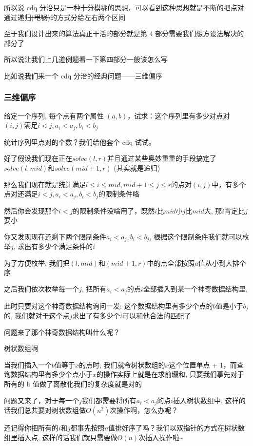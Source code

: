 所以说 cdq 分治只是一种十分模糊的思想，可以看到这种思想就是不断的把点对通过递归\sout{(甩锅)}的方式分给左右两个区间

至于我们设计出来的算法真正干活的部分就是第 4 部分需要我们想方设法解决的部分了

所以说让我们上几道例题看一下第四部分一般该怎么写

比如说我们来一个 cdq 分治的经典问题——三维偏序

\subsubsection{三维偏序}

给定一个序列, 每个点有两个属性 $(a,b)$，试求：这个序列里有多少对点对$(i,j)$满足$i<j,a_{i}<a_{j},b_{i}<b_{j}$

统计序列里点对的个数？我们给他套个 cdq 试试。

好了假设我们现在正在$solve(l,r)$并且通过某些奥妙重重的手段搞定了$solve(l,mid)$和$solve(mid+1,r)$ (其实就是递归)

那么我们现在就是统计满足$l \leq i \leq mid,mid+1 \leq j \leq r$的点对$(i,j)$中，有多个点对还满足$i<j,a_{i}<a_{j},b_{i}<b_{j}$的限制条件咯

然后你会发现那个$i<j$的限制条件没啥用了，既然$i$比$mid$小$j$比$mid$大, 那$i$肯定比$j$要小

你又发现现在还剩下两个限制条件$a_{i}<a_{j},b_{i}<b_{j}$, 根据这个限制条件我们就可以枚举$j$, 求出有多少个满足条件的$i$

为了方便枚举, 我们把$(l,mid)$和$(mid+1,r)$中的点全部按照$a$值从小到大排个序

之后我们依次枚举每一个$j$, 把所有$a_{i}<a_{j}$的点$i$全部插入到某一个神奇数据结构里,

此时只要对这个神奇数据结构询问一发: 这个数据结构里有多少个点的$b$值是小于$b_{j}$的, 我们就对于这个点$j$求出了有多少个$i$可以和他合法的匹配了

问题来了那个神奇数据结构叫什么呢？

树状数组啊

当我们插入一个$b$值等于$x$的点时, 我们就令树状数组的$x$这个位置单点 + 1，而查询数据结构里有多少个点小于$x$的操作实际上就是在求前缀和, 只要我们事先对于所有的 b 值做了离散化我们的复杂度就是对的

问题又来了，对于每一个$j$我们都需要将所有$a_{i}<a_{j}$的点$i$插入树状数组中, 这样的话我们总共要对树状数组做$O(n^2)$次操作啊，怎么办呢？

还记得你把所有的$i$和$j$都事先按照$a$值排好序了吗？我们以双指针的方式在树状数组里插入点, 这样的话我们就只需要做$O(n)$次插入操作啦\textasciitilde{}

